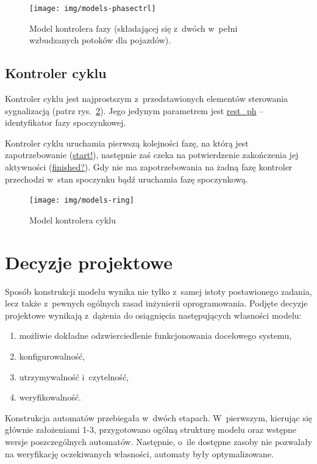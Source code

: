\documentclass{pracamgr}
\newcommand{\imgr}[1]{rys.~\ref{#1}}
\theoremstyle{plain}
\begin{document}
\begin{figure}
  \centering
  \texttt{[image: img/models-phasectrl]}
  \caption{Model kontrolera fazy (składającej się z~dwóch w~pełni wzbudzanych potoków dla pojazdów).}
  \label{img:phase-ctrl}
\end{figure}

\subsection{Kontroler cyklu}
\label{ss:models:models:ring}
Kontroler cyklu jest najprostszym z~przedstawionych elementów
sterowania sygnalizacją (patrz \imgr{img:ring-ctrl}). Jego jedynym
parametrem jest \url{rest_ph} -- identyfikator fazy spoczynkowej.

Kontroler cyklu uruchamia pierwszą kolejności fazę, na którą
jest zapotrzebowanie (\url{start!}), następnie zaś czeka na
potwierdzenie zakończenia jej aktywności (\url{finished?}). Gdy nie ma
zapotrzebowania na żadną fazę kontroler przechodzi w~stan spoczynku
bądź uruchamia fazę spoczynkową.

\begin{figure}
  \centering
  \texttt{[image: img/models-ring]}
  \caption{Model kontrolera cyklu}
  \label{img:ring-ctrl}
\end{figure}

\section{Decyzje projektowe}
\label{s:models:project}

Sposób konstrukcji modelu wynika nie tylko z~samej istoty postawionego
zadania, lecz także z~pewnych ogólnych zasad inżynierii
oprogramowania. Podjęte decyzje projektowe wynikają z~dążenia do
osiągnięcia następujących własności modelu:
\begin{enumerate}
  \item możliwie dokładne odzwierciedlenie funkcjonowania docelowego systemu,
  \item konfigurowalność,
  \item utrzymywalność i~czytelność,
  \item weryfikowalność.
\end{enumerate}
Konstrukcja automatów przebiegała w~dwóch etapach. W~pierwszym,
kierując się głównie założeniami 1-3, przygotowano ogólną strukturę
modelu oraz wstępne wersje poszczególnych automatów. Następnie, o~ile
dostępne zasoby nie pozwalały na weryfikację oczekiwanych własności,
automaty były optymalizowane.
\end{document}
